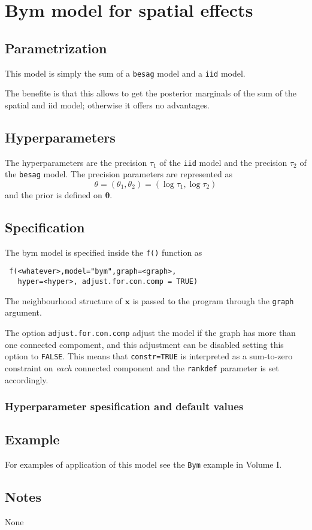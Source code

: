 \documentclass[a4paper,11pt]{article}
\begin{document}
\section*{Bym model for spatial effects}

\subsection*{Parametrization}

This model is simply the sum of a \lstinline$besag$ model and a
\lstinline$iid$ model.
 
The benefite is that this allows to get the posterior marginals of the
sum of the spatial and iid model; otherwise it offers no advantages.

\subsection*{Hyperparameters}
The hyperparameters are the precision $\tau_1$ of the \lstinline$iid$
model and the precision $\tau_2$ of the \lstinline$besag$ model.  The
precision parameters are represented as
\begin{displaymath}
    \theta=(\theta_1,\theta_2) =(\log \tau_1,\log \tau_2)
\end{displaymath}
and the prior is defined on $\mathbf{\theta}$.

\subsection*{Specification}

The bym model is specified inside the {\tt f()} function as
\begin{verbatim}
 f(<whatever>,model="bym",graph=<graph>,
   hyper=<hyper>, adjust.for.con.comp = TRUE)
\end{verbatim}

The neighbourhood structure of $\mathbf{x}$ is passed to the program
through the {\tt graph} argument.

The option \verb|adjust.for.con.comp| adjust the model if the graph
has more than one connected compoment, and this adjustment can be
disabled setting this option to \texttt{FALSE}. This means that
\texttt{constr=TRUE} is interpreted as a sum-to-zero constraint on
\emph{each} connected component and the \texttt{rankdef} parameter is
set accordingly. 

\subsubsection*{Hyperparameter spesification and default values}



\subsection*{Example}

For examples of application of this model see the {\tt Bym} example in
Volume I.

\subsection*{Notes}

None
\end{document}
